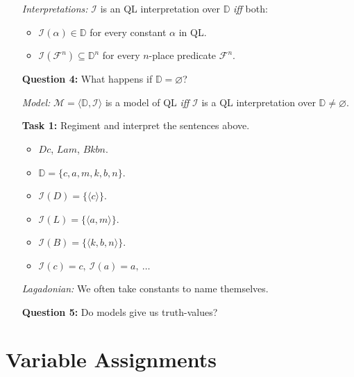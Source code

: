 \documentclass[a4paper, 11pt]{article} %
\newcommand{\tuple}[1]{\langle#1\rangle} %
\newcommand{\set}[1]{\lbrace#1\rbrace} %
\newcommand{\I}{\mathcal{I}}
\newcommand{\F}{\mathcal{F}}
\newcommand{\M}{\mathcal{M}}
\newcommand{\D}{\mathbb{D}}
\begin{document}
\begin{enumerate}
  \item[\it Interpretations:] $\I$ is an QL interpretation over $\D$ \textit{iff} both: 
    \begin{itemize}
      \item $\I(\alpha)\in\D$ for every constant $\alpha$ in QL. 
      \item $\I(\F^n)\subseteq\D^n$ for every $n$-place predicate $\F^n$.
    \end{itemize}
  \item[\bf Question 4:] What happens if $\D=\varnothing$?
  \item[\it Model:] $\M=\tuple{\D,\I}$ is a model of QL \textit{iff} $\I$ is a QL interpretation over $\D\neq\varnothing$.
  \item[\bf Task 1:] Regiment and interpret the sentences above.
    \begin{itemize}
      \item $Dc$, $Lam$, $Bkbn$.
      \item $\D=\set{c,a,m,k,b,n}$.
      \item $\I(D)=\set{\tuple{c}}$.
      \item $\I(L)=\set{\tuple{a,m}}$.
      \item $\I(B)=\set{\tuple{k,b,n}}$.
      \item $\I(c)=c,\ \I(a)=a,\ \ldots$
    \end{itemize}
  \item[\it Lagadonian:] We often take constants to name themselves.
  \item[\bf Question 5:] Do models give us truth-values?
\end{enumerate}



\section*{Variable Assignments}
\end{document}

